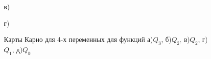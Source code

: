 \begin{figure}[h!]
\begin{minipage}[h]{0.47\linewidth}
		\end{minipage}
		\vfill
		\begin{minipage}[h]{0.47\linewidth}
			 в) \\
		\end{minipage}
		\hfill
		\begin{minipage}[h]{0.47\linewidth}
			 г) \\
		\end{minipage}
		\caption{Карты Карно для 4-х переменных для функций а)$Q_3$, б)$Q_2$, в)$Q_2$, г)$Q_1$, д)$Q_0$}
		\label{ris:karno-maps}
	\end{figure}

